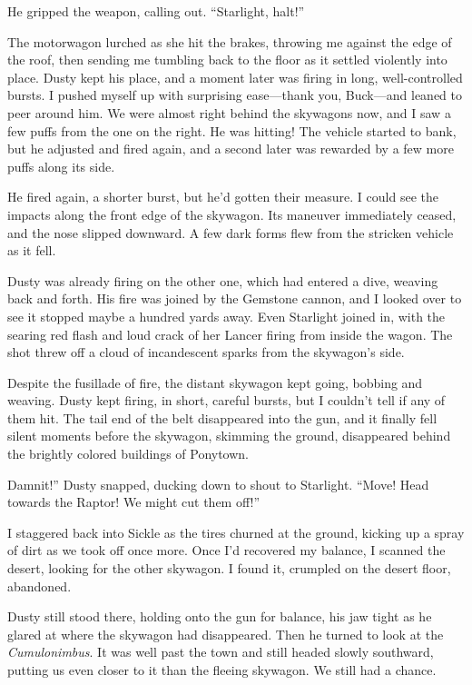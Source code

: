 He gripped the weapon, calling out. “Starlight, halt!”

The motorwagon lurched as she hit the brakes, throwing me against the edge of the roof, then sending me tumbling back to the floor as it settled violently into place. Dusty kept his place, and a moment later was firing in long, well-controlled bursts. I pushed myself up with surprising ease—thank you, Buck—and leaned to peer around him. We were almost right behind the skywagons now, and I saw a few puffs from the one on the right. He was hitting! The vehicle started to bank, but he adjusted and fired again, and a second later was rewarded by a few more puffs along its side.

He fired again, a shorter burst, but he’d gotten their measure. I could see the impacts along the front edge of the skywagon. Its maneuver immediately ceased, and the nose slipped downward. A few dark forms flew from the stricken vehicle as it fell.

Dusty was already firing on the other one, which had entered a dive, weaving back and forth. His fire was joined by the Gemstone cannon, and I looked over to see it stopped maybe a hundred yards away. Even Starlight joined in, with the searing red flash and loud crack of her Lancer firing from inside the wagon. The shot threw off a cloud of incandescent sparks from the skywagon’s side.

Despite the fusillade of fire, the distant skywagon kept going, bobbing and weaving. Dusty kept firing, in short, careful bursts, but I couldn’t tell if any of them hit. The tail end of the belt disappeared into the gun, and it finally fell silent moments before the skywagon, skimming the ground, disappeared behind the brightly colored buildings of Ponytown.

\leavevmode{}Damnit!” Dusty snapped, ducking down to shout to Starlight. “Move! Head towards the Raptor! We might cut them off!”

I staggered back into Sickle as the tires churned at the ground, kicking up a spray of dirt as we took off once more. Once I’d recovered my balance, I scanned the desert, looking for the other skywagon. I found it, crumpled on the desert floor, abandoned.

Dusty still stood there, holding onto the gun for balance, his jaw tight as he glared at where the skywagon had disappeared. Then he turned to look at the \textit{Cumulonimbus}. It was well past the town and still headed slowly southward, putting us even closer to it than the fleeing skywagon. We still had a chance.

